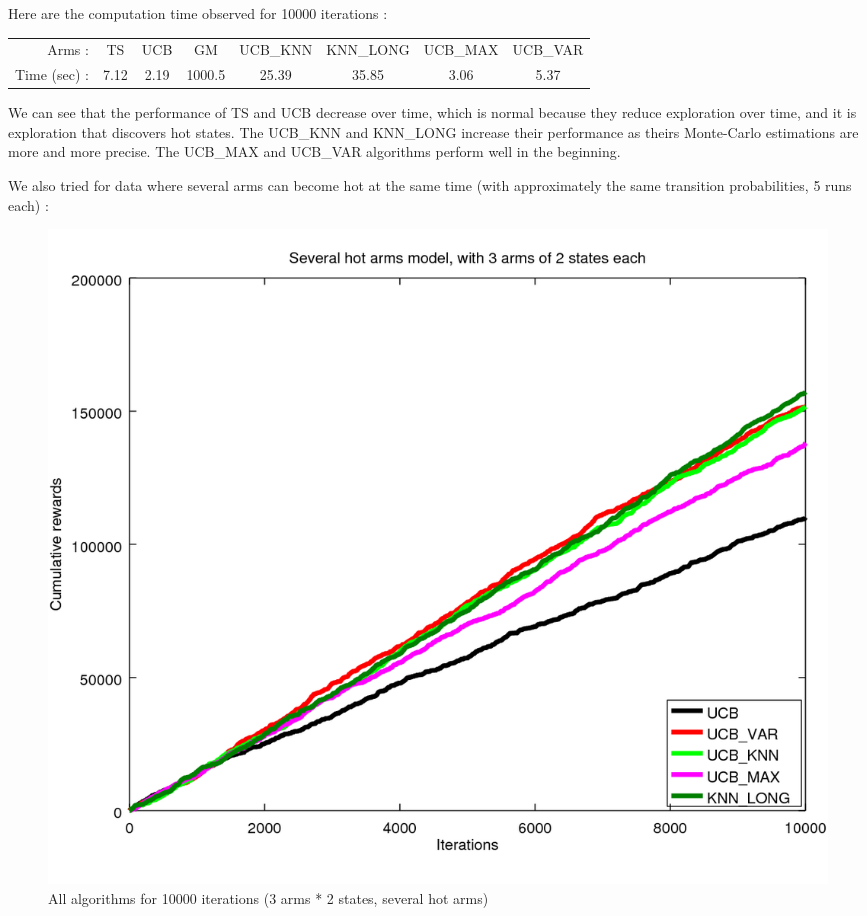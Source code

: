 \documentclass[french]{beamer}
\begin{document}
\begin{frame}
	Here are the computation time observed for 10000 iterations :
	\begin{center}
		\begin{tabular}{rccccccc}
			Arms : & TS & UCB & GM & UCB\_KNN & KNN\_LONG & UCB\_MAX & UCB\_VAR \\
			Time (sec) : & 7.12 & 2.19 & 1000.5 & 25.39 & 35.85 & 3.06 & 5.37
		\end{tabular}
	\end{center}
	
	We can see that the performance of TS and UCB decrease over time, which is normal because they reduce exploration over time, and it is exploration that discovers hot states. The UCB\_KNN and KNN\_LONG increase their performance as theirs Monte-Carlo estimations are more and more precise. The UCB\_MAX and UCB\_VAR algorithms perform well in the beginning.
	
	\clearpage
	We also tried for data where several arms can become hot at the same time (with approximately the same transition probabilities, 5 runs each) :
	
	\begin{figure}[h]
		\begin{center}
			\includegraphics[width=1.0\textwidth]{all_m_10000it.png}
		\end{center}
		\caption{All algorithms for 10000 iterations (3 arms * 2 states, several hot arms)}
	\end{figure}
	

\end{frame}
\end{document}
